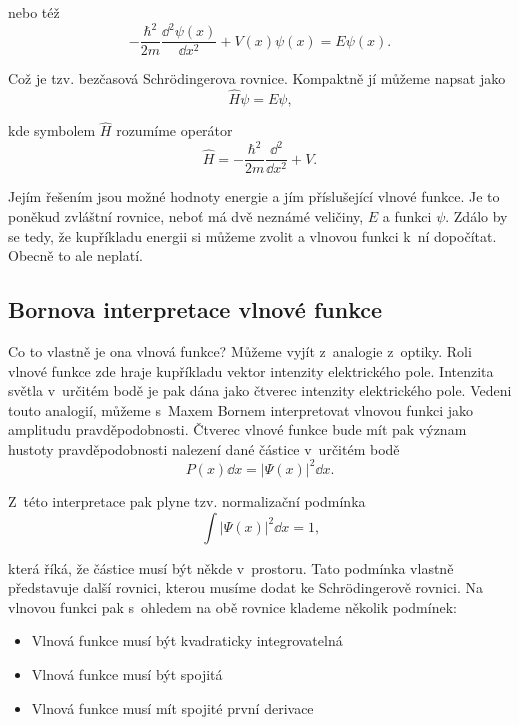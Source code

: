 \noindent nebo též
\begin{equation}
\boxed{-\frac{\hbar^2}{2m}\frac{\dd^2\psi(x)}{\dd x^2} + V(x)\psi(x) = E\psi(x) \mbox{.}}
\label{rov:Pohyboverovnice6}
\end{equation}

\noindent Což je tzv. bezčasová Schr\"odingerova rovnice. Kompaktně jí můžeme napsat jako
\begin{equation}
\hat{H}\psi = E\psi\mbox{,}
\label{rov:Pohyboverovnice7}
\end{equation}

\noindent kde symbolem $\hat{H}$ rozumíme operátor
\begin{equation}
\hat{H} = -\frac{\hbar^2}{2m}\frac{\dd^2}{\dd x^2} + V\mbox{.}
\label{rov:Pohyboverovnice8}
\end{equation}

\noindent Jejím řešením jsou možné hodnoty energie a jím příslušející vlnové funkce. Je to poněkud zvláštní rovnice, neboť má dvě neznámé veličiny, $E$ a funkci $\psi$. Zdálo by se tedy, že kupříkladu energii si můžeme zvolit a vlnovou funkci k~ní dopočítat. Obecně to ale neplatí. 

\subsection{Bornova interpretace vlnové funkce}
\label{kap:Bornova interpretace vlnové funkce}

Co to vlastně je ona vlnová funkce?  Můžeme vyjít z~analogie z~optiky. Roli vlnové funkce zde hraje kupříkladu vektor intenzity elektrického pole. Intenzita světla v~určitém bodě je pak dána jako čtverec intenzity elektrického pole.
Vedeni touto analogií, můžeme s~Maxem Bornem interpretovat vlnovou funkci jako amplitudu pravděpodobnosti. Čtverec vlnové funkce bude mít pak význam hustoty pravděpodobnosti nalezení dané částice v~určitém bodě
\begin{equation}
P(x)\dd x = |\Psi (x)|^2\dd x \mbox{.}
\label{rov:Born1}
\end{equation}

\noindent Z~této interpretace pak plyne tzv. normalizační podmínka
\begin{equation}
\int |\Psi(x)|^2 \dd x = 1\mbox{,}
\label{rov:Born2}
\end{equation}

\noindent která říká, že částice musí být někde v~prostoru. Tato podmínka vlastně představuje další rovnici, kterou musíme dodat ke Schr\"odingerově rovnici. Na vlnovou funkci pak s~ohledem na obě rovnice klademe několik podmínek:
\begin{itemize}
\item Vlnová funkce musí být kvadraticky integrovatelná
\item Vlnová funkce musí být spojitá
\item Vlnová funkce musí mít spojité první derivace
\end{itemize}

